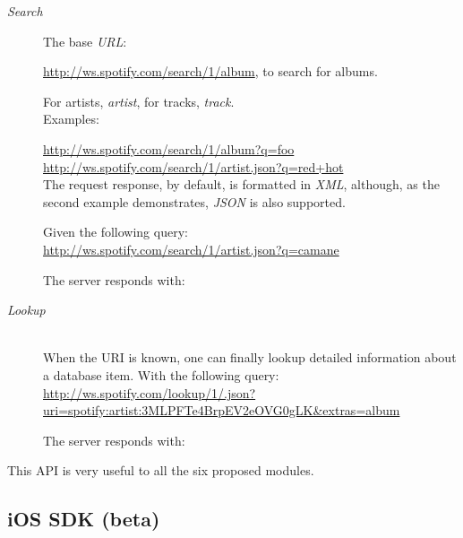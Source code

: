       \begin{description}
        \item[\emph{Search}] \hfill

          The base \emph{URL}:

          \url{http://ws.spotify.com/search/1/album}, to search for albums.

          For artists, \emph{artist}, for tracks, \emph{track}. \\

          Examples:

          \url{http://ws.spotify.com/search/1/album?q=foo} \\
          \url{http://ws.spotify.com/search/1/artist.json?q=red+hot} \\

          The request response, by default, is formatted in \emph{XML}, although, as the second example demonstrates, \emph{JSON} is also supported.

          Given the following query: \\
          \url{http://ws.spotify.com/search/1/artist.json?q=camane}

          The server responds with:

          

        \item[\emph{Lookup}] \hfill \\

          When the URI is known, one can finally lookup detailed information about a database item. With the following query: \\

          \url{http://ws.spotify.com/lookup/1/.json?uri=spotify:artist:3MLPFTe4BrpEV2eOVG0gLK&extras=album}

          The server responds with:

          

      \end{description}

      This API is very useful to all the six proposed modules.


    \subsection{iOS SDK (beta)} %
    \label{sub:ios_sdk}
    
